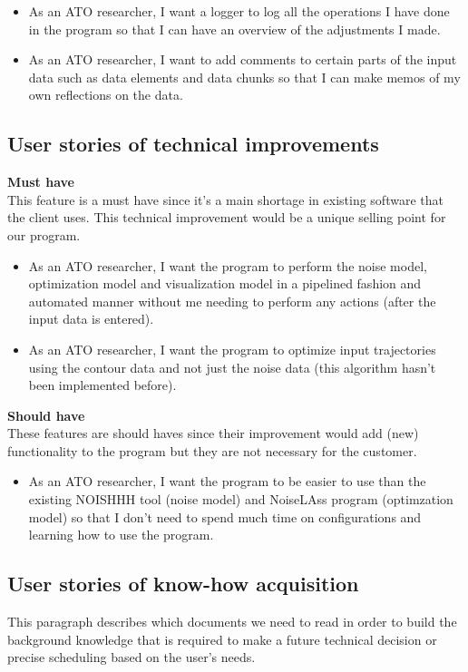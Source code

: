 ﻿\documentclass[a4paper,english,fleqn]{exam}
\begin{document}
\begin{itemize}
\item As an ATO researcher, I want a logger to log all the operations I have done in the program so that I can have an overview of the adjustments I made.
\item As an ATO researcher, I want to add comments to certain parts of the input data such as data elements and data chunks so that I can make memos of my own reflections on the data.
\end{itemize}

\newpage
\subsection{User stories of technical improvements}
\textbf{Must have} \\
This feature is a must have since it's a main shortage in existing software that the client uses. This technical improvement would be a unique selling point for our program. 
\begin{itemize}
\item As an ATO researcher, I want the program to perform the noise model, optimization model and visualization model in a pipelined fashion and automated manner without me needing to perform any actions (after the input data is entered).
\item As an ATO researcher, I want the program to optimize input trajectories using the contour data and not just the noise data (this algorithm hasn't been implemented before).
\end{itemize}

\textbf{Should have} \\
These features are should haves since their improvement would add (new) functionality to the program but they are not necessary for the customer. 
\begin{itemize}
\item As an ATO researcher, I want the program to be easier to use than the existing NOISHHH tool (noise model) and NoiseLAss program (optimzation model) so that I don't need to spend much time on configurations and learning how to use the program.
\end{itemize}

\subsection{User stories of know-how acquisition}
This paragraph describes which documents we need to read in order to build the background knowledge that is required to make a future technical decision or precise scheduling based on the user's needs. 
\end{document}

